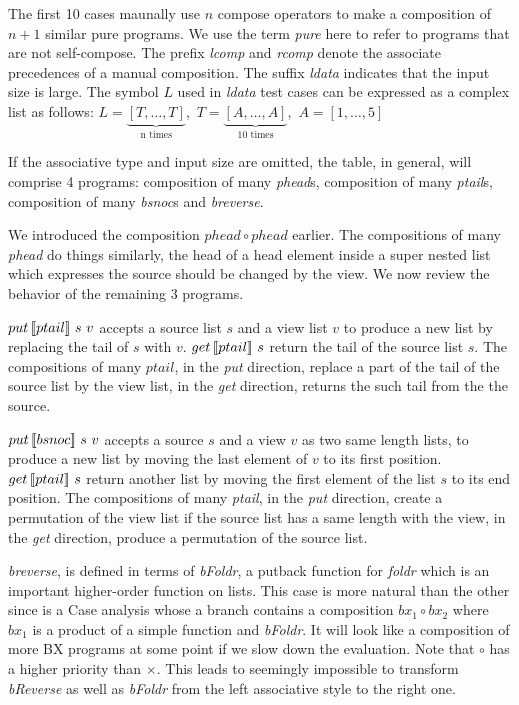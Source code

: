 The first 10 cases maunally use $n$ compose operators to make a composition of $n + 1$ similar pure programs. We use the term \textit{pure} here to refer to programs that are not self-compose. The prefix \textit{lcomp} and \textit{rcomp} denote the associate precedences of a manual composition. The suffix \textit{ldata} indicates that the input size is large. The symbol $L$ used in \textit{ldata} test cases can be expressed as a complex list as follows: $L = \underbrace{[T,\ldots,T]}_{\text{n times}}$,\ $T = \underbrace{[A,\ldots,A]}_{\text{10 times}}$,\ $A = [1,\ldots,5]$

If the associative type and input size are omitted, the table, in general, will comprise 4 programs: composition of many \textit{phead}s, composition of many \textit{ptail}s, composition of many \textit{bsnoc}s and \textit{breverse}.

We introduced the composition $phead \circ phead$ earlier. The compositions of many \textit{phead} do things similarly, the head of a head element inside a super nested list which expresses the source should be changed by the view. We now review the behavior of the remaining 3 programs.

\tab $put \, [\![ptail]\!] \ s \ v$ accepts a source list $s$ and a view list $v$ to produce a new list by replacing the tail of $s$ with $v$. $get \, [\![ptail]\!] \ s$ return the tail of the source list $s$. The compositions of many $ptail$, in the \textit{put} direction, replace a part of the tail of the source list by the view list, in the \textit{get} direction, returns the such tail from the the source.

\tab $put \, [\![bsnoc]\!] \ s \ v$ accepts a source $s$ and a view $v$ as two same length lists, to produce a new list by moving the last element of $v$ to its first position. $get \, [\![ptail]\!] \ s$ return another list by moving the first element of the list $s$ to its end position. The compositions of many \textit{ptail}, in the \textit{put} direction, create a permutation of the view list if the source list has a same length with the view, in the \textit{get} direction, produce a permutation of the source list.

\tab \textit{breverse}, is defined in terms of \textit{bFoldr}, a putback function for \textit{foldr} which is an important higher-order function on lists. This case is more natural than the other since  is a Case analysis whose a branch contains a composition $bx_1 \circ bx_2$ where $bx_1$ is a product of a simple function and \textit{bFoldr}. It will look like a composition of more BX programs at some point if we slow down the evaluation. Note that $\circ$ has a higher priority than $\times$. This leads to seemingly impossible to transform \textit{bReverse} as well as \textit{bFoldr} from the left associative style to the right one.

